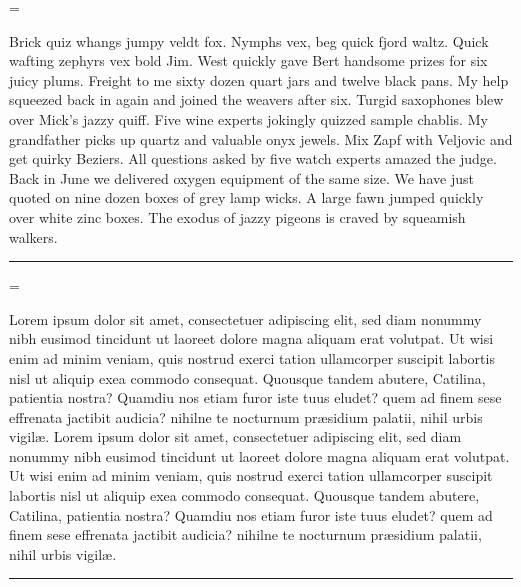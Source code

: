 \pantext={Brick quiz whangs jumpy veldt fox.
Nymphs vex, beg quick fjord waltz.
Quick wafting zephyrs vex bold Jim.
West quickly gave Bert handsome prizes for six juicy plums.
Freight to me sixty dozen quart jars and twelve black pans.
My help squeezed back in again and joined the weavers after six.
Turgid saxophones blew over Mick's jazzy quiff.
Five wine experts jokingly quizzed sample chablis.
My grandfather picks up quartz and valuable onyx jewels.
Mix Zapf with Veljovic and get quirky Beziers.
All questions asked by five watch experts amazed the judge.
Back in June we delivered oxygen equipment of the same size.
We have just quoted on nine dozen boxes of grey lamp wicks.
A large fawn jumped quickly over white zinc boxes.
The exodus of jazzy pigeons is craved by squeamish walkers.\thinspace\nobreak\leaders\hrule\hfill\hbox{}\par}

\loremtext={Lorem ipsum
dolor sit amet, consectetuer adipiscing elit, sed diam
nonummy nibh eusi\-mod tincidunt ut laor\-eet dolore magna
ali\-quam erat volutpat. Ut wisi enim ad minim veniam, quis
nostrud exerci tation ullamcorper suscipit la\-bortis nisl
ut ali\-quip exea commodo consequat.
Quousque tandem abutere, Catilina, patientia nostra? Quamdiu nos etiam furor iste tuus eludet?
quem ad finem sese effrenata jactibit audicia? nihilne te nocturnum pr\ae sidium palatii, nihil
urbis vigil\ae .
Lorem ipsum
dolor sit amet, consectetuer adipiscing elit, sed diam
nonummy nibh eusi\-mod tincidunt ut laor\-eet dolore magna
ali\-quam erat volutpat. Ut wisi enim ad minim veniam, quis
nostrud exerci tation ullamcorper suscipit la\-bortis nisl
ut ali\-quip exea commodo consequat.
Quousque tandem abutere, Catilina, patientia nostra? Quamdiu nos etiam furor iste tuus eludet?
quem ad finem sese effrenata jactibit audicia? nihilne te nocturnum pr\ae sidium palatii, nihil
urbis vigil\ae .\thinspace\nobreak\leaders\hrule\hfill\null\par}

\def\abc{abcdefghijklmnopqrstuvwxyz}
\def\habc{\abc\abc abcdefghijklm}
\def\dabc{AGQMstaefgpy1234?!\&}
\def\ucabc{ABCDEFGHIJKLMNOPQRSTUVWXYZ}
\def\buclcabc{AaBbCcDdEeFfGgHhIiJjKkLlMmNnOo}
\def\euclcabc{PpQqRrSsTtUuVvWwXxYyZz?\&}
\def\freqabc{\text  zjqx%
       kkvv%
       bbbbppppyyyywwwwgggg%
       mmmmmmffffffccccccuuuuuu%
       lllllllldddddddd%
       hhhhhhhhhhhhrrrrrrrrrrrrssssssssssss%
       ooooooooooooooiiiiiiiiiiiiiinnnnnnnnnnnnnn%
       aaaaaaaaaaaaaaaatttttttttttttttttt%
       eeeeeeeeeeeeeeeeeeeeeeee}%
\def\ast{*} \def\per{.}

